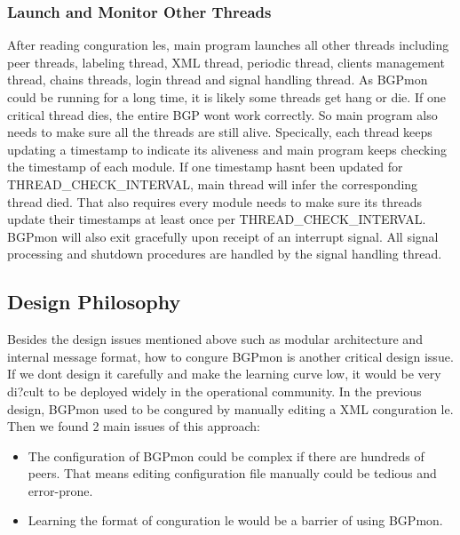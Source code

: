 \subsubsection{Launch and Monitor Other Threads}
After reading conguration les, main program launches all other threads including peer threads, labeling thread, XML thread, periodic thread, clients management thread, chains threads, login thread and signal handling thread. 
As BGPmon could be running for a long time, it is likely some threads get hang or die. If one critical thread dies, the entire BGP wont work correctly. So main program also needs to make sure all the threads are still alive. Specically, each thread keeps updating a timestamp to indicate its aliveness and main program keeps checking the timestamp of each module. If one timestamp hasnt been updated for THREAD\_CHECK\_INTERVAL, main thread will infer the corresponding thread died. That also requires every module needs to make sure its threads update their timestamps at least once per THREAD\_CHECK\_INTERVAL. BGPmon will also exit gracefully upon receipt of an interrupt signal. All signal processing and shutdown procedures are handled by the signal handling thread. 

 
 \subsection{Design Philosophy}
 \label{sec:main:design}
Besides the design issues mentioned above such as modular architecture and internal message format, how to congure BGPmon is another critical design issue. If we dont design it carefully and make the learning curve low, it would be very di?cult to be deployed widely in the operational community. In the previous design, BGPmon used to be congured by manually editing a XML conguration le. Then we found 2 main issues of this approach: 
 \begin{itemize}
	 	\item{ The configuration of BGPmon could be complex if there are hundreds of peers. That means editing configuration file manually could be tedious and error-prone.}
		\item{ Learning the format of conguration le would be a barrier of using BGPmon.  }
\end{itemize} 

